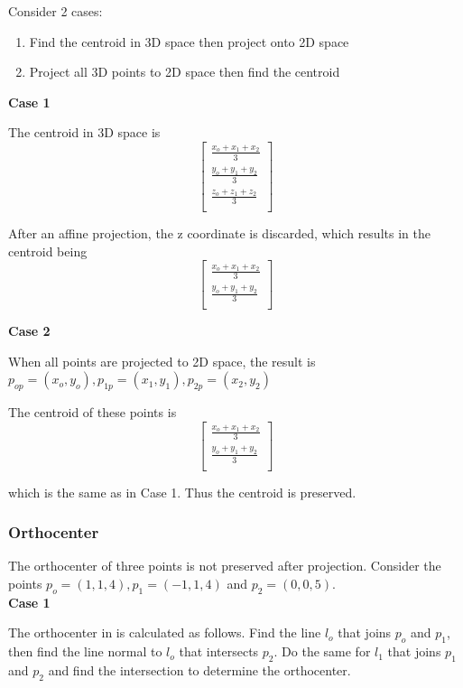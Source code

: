 \documentclass[a4paper,10pt]{scrartcl}
\begin{document}
Consider 2 cases: 
\begin{enumerate}
 \item Find the centroid in 3D space then project onto 2D space
 \item Project all 3D points to 2D space then find the centroid
\end{enumerate}

{\bfseries Case 1}

The centroid in 3D space is 
\[ \begin{bmatrix}
    \frac{x_o + x_1 + x_2}{3}\\
    \frac{y_o + y_1 + y_2}{3}\\
    \frac{z_o + z_1 + z_2}{3}\\
  \end{bmatrix}
\]

After an affine projection, the z coordinate is discarded, which results in the centroid being
\[\begin{bmatrix}
    \frac{x_o + x_1 + x_2}{3}\\
    \frac{y_o + y_1 + y_2}{3}\\
  \end{bmatrix}\]

{\bfseries Case 2}

When all points are projected to 2D space, the result is $p_{op} = (x_o, y_o) , p_{1p} = (x_1, y_1), p_{2p} = (x_2, y_2)$

The centroid of these points is \[\begin{bmatrix}
    \frac{x_o + x_1 + x_2}{3}\\
    \frac{y_o + y_1 + y_2}{3}\\
  \end{bmatrix}\]
  
which is the same as in Case 1. Thus the centroid is preserved.


\subsubsection{Orthocenter}
The orthocenter of three points is not preserved after projection. Consider the points $p_o = (1, 1, 4), p_1 = (-1, 1, 4)$ and $p_2 = (0, 0, 5)$.\\

\pagebreak
{\bfseries Case 1}

The orthocenter in is calculated as follows. Find the line $l_o$ that joins $p_o$ and $p_1$, then find the line normal
to $l_o$ that intersects $p_2$. Do the same for $l_1$ that joins $p_1$ and $p_2$ and find the intersection to 
determine the orthocenter.
\end{document}
